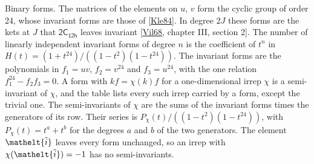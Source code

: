 \documentclass[10pt,a4paper]{article}
\makeatletter
\renewcommand\paragraph{\@startsection{paragraph}{4}{\z@}{1.5ex plus .5ex minus .2ex}{-1em}%
  {\normalfont\small\sffamily\bfseries\color{parttitle}}}
\numberwithin{equation}{section}
\newcommand{\eltfont}[1]{{\let\sigma\eltsigma\mathelt{#1}}}
\newcommand{\grp}[1]{\mathsf{#1}}
\newcommand{\elt}[1]{\eltfont{#1}}
\newcommand{\lift}[1]{\tilde{#1}}
\makeatother
\begin{document}
\paragraph{Binary forms.}
The matrices of the elements on $u$, $v$ form the cyclic group of order 24, whose invariant forms are those of [\href{../../../REFERENCES.pdf\#ref.Kle84}{Kle84}]. In degree $2J$ these forms are the kets at $J$ that $\grp{2C_{12h}}$ leaves invariant [\href{../../../REFERENCES.pdf\#ref.Vil68}{Vil68}, chapter III, section 2]. The number of linearly independent invariant forms of degree $n$ is the coefficient of $t^n$ in $H(t) = (1 + t^{24})/((1-t^{2})(1-t^{24}))$. The invariant forms are the polynomials in $f_1 = uv$, $f_2 = v^{24}$ and $f_3 = u^{24}$, with the one relation $f_{1}^{24} - f_{2}f_{3} = 0$.
A form with $k f = \chi(k) f$ for a one-dimensional irrep $\chi$ is a semi-invariant of $\chi$, and the table lists every such irrep carried by a form, except the trivial one. \label{n:head.generators}The semi-invariants of $\chi$ are the sums of the invariant forms times the generators of its row. Their series is $P_\chi(t)/((1-t^{2})(1-t^{24}))$, with $P_\chi(t) = t^{a} + t^{b}$ for the degrees $a$ and $b$ of the two generators. The element $\elt{\lift{i}}$ leaves every form unchanged, so an irrep with $\chi(\elt{\lift{i}}) = -1$ has no semi-invariants.
\end{document}
